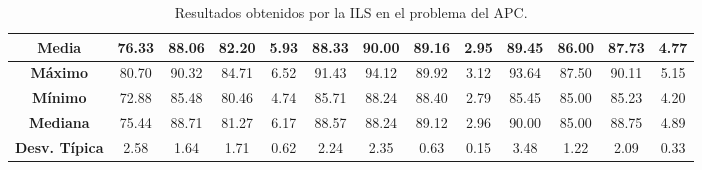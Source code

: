 \documentclass[11pt,a4paper]{article}
\begin{document}
\begin{table}[H]
{\begin{tabular}{c|c|c|c|c|c|c|c|c|c|c|c|c|}
\multicolumn{1}{|c|}{\textbf{Media}}        & 76.33                      & 88.06                   & 82.20                  & 5.93       & 88.33                      & 90.00                   & 89.16                  & 2.95       & 89.45                      & 86.00                   & 87.73                  & 4.77       \\ \hline
\multicolumn{1}{|c|}{\textbf{Máximo}}       & 80.70                      & 90.32                   & 84.71                  & 6.52       & 91.43                      & 94.12                   & 89.92                  & 3.12       & 93.64                      & 87.50                   & 90.11                  & 5.15       \\ \hline
\multicolumn{1}{|c|}{\textbf{Mínimo}}       & 72.88                      & 85.48                   & 80.46                  & 4.74       & 85.71                      & 88.24                   & 88.40                  & 2.79       & 85.45                      & 85.00                   & 85.23                  & 4.20       \\ \hline
\multicolumn{1}{|c|}{\textbf{Mediana}}      & 75.44                      & 88.71                   & 81.27                  & 6.17       & 88.57                      & 88.24                   & 89.12                  & 2.96       & 90.00                      & 85.00                   & 88.75                  & 4.89       \\ \hline
\multicolumn{1}{|c|}{\textbf{Desv. Típica}} & 2.58                       & 1.64                    & 1.71                   & 0.62       & 2.24                       & 2.35                    & 0.63                   & 0.15       & 3.48                       & 1.22                    & 2.09                   & 0.33       \\ \hline
\end{tabular}
}%
\caption{Resultados obtenidos por la ILS en el problema del APC.}
\end{table}
\end{document}
